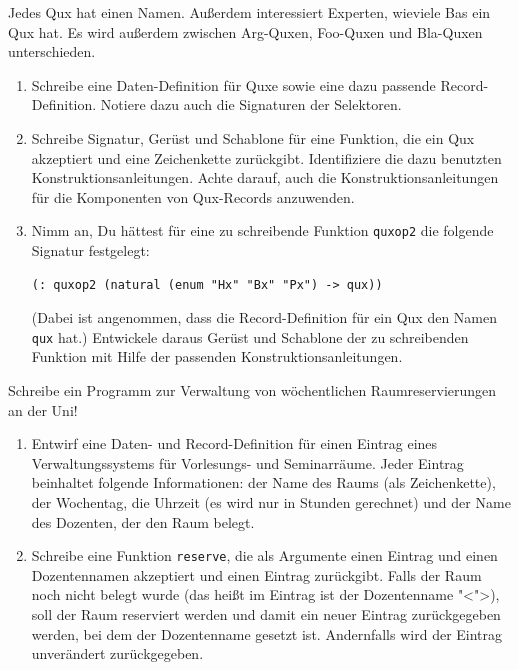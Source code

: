 \begin{aufgabe}

  Jedes Qux hat einen Namen.  Außerdem interessiert
  Experten, wieviele Bas ein Qux hat.  Es wird außerdem zwischen
  Arg-Quxen, Foo-Quxen und Bla-Quxen unterschieden.
  \begin{enumerate}
  \item Schreibe eine Daten-Definition für Quxe sowie eine dazu
    passende Record-Definition. Notiere dazu auch die Signaturen der
    Selektoren.
  \item Schreibe Signatur, Gerüst und Schablone für eine Funktion,
    die ein Qux akzeptiert und eine Zeichenkette zurückgibt.
    Identifiziere die dazu benutzten Konstruktionsanleitungen.
    Achte darauf, auch die Konstruktionsanleitungen für die
    Komponenten von Qux-Records anzuwenden.
  \item Nimm an, Du hättest für eine zu schreibende Funktion
    \lstinline{quxop2} die folgende Signatur festgelegt:
\begin{lstlisting}
(: quxop2 (natural (enum "Hx" "Bx" "Px") -> qux))
\end{lstlisting}
    (Dabei ist angenommen, dass die Record-Definition für ein Qux
    den Namen \lstinline{qux} hat.) Entwickele daraus Gerüst und
    Schablone der zu schreibenden Funktion mit Hilfe der
    passenden Konstruktionsanleitungen.
  \end{enumerate}

\end{aufgabe}

\begin{aufgabe}

  Schreibe ein Programm zur Verwaltung von wöchentlichen
  Raumreservierungen an der Uni!

  \begin{enumerate}
  \item Entwirf eine Daten- und Record-Definition für einen Eintrag eines
    Verwaltungssystems für Vorlesungs- und Seminarräume. Jeder Eintrag beinhaltet
    folgende Informationen: der Name des Raums (als Zeichenkette), der Wochentag,
    die Uhrzeit (es wird nur in Stunden gerechnet) und der Name des Dozenten, der
    den Raum belegt.

  \item Schreibe eine Funktion \lstinline{reserve}, die als Argumente einen Eintrag und einen
    Dozentennamen akzeptiert und einen Eintrag zurückgibt. Falls der Raum noch nicht belegt
    wurde (das heißt im Eintrag ist der Dozentenname "<">), soll der Raum reserviert werden und
    damit ein neuer Eintrag zurückgegeben werden, bei dem der Dozentenname gesetzt ist.
    Andernfalls wird der Eintrag unverändert zurückgegeben.
  \end{enumerate}
\end{aufgabe}


